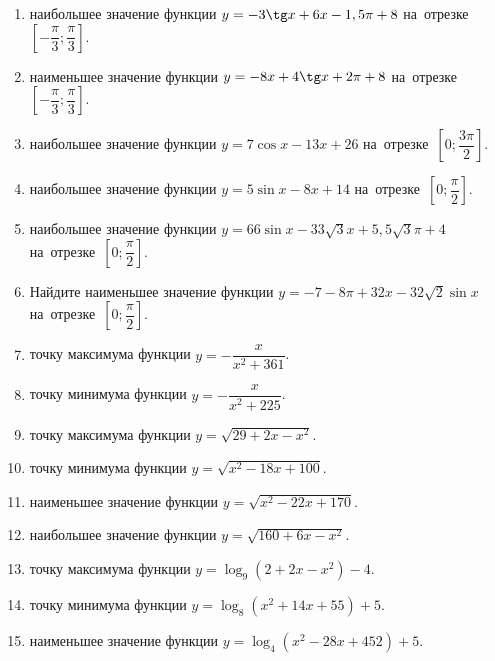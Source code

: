 \documentclass[a4paper,10pt]{article}
\begin{document}
\begin{enumerate}
\item {} наибольшее значение функции $y=-3\tg x +6x-1,5\pi +8$ на~отрезке~$\left[-\dfrac{\pi}{3};\dfrac{\pi}{3}\right]$.

\item {} наименьшее значение функции $y=-8x +4\tg x+2\pi+8$ на~отрезке~$\left[-\dfrac{\pi}{3};\dfrac{\pi}{3}\right]$.

\item {} наибольшее значение функции $y=7\cos x-13x+26$ на~отрезке~$\left[0;\dfrac{3\pi}{2}\right]$.

\item {} наибольшее значение функции $y=5\sin x-8x+14$ на~отрезке~$\left[0;\dfrac{\pi}{2}\right]$.

\item {} наибольшее значение функции $y=66\sin x-33\sqrt{3}x+5,5\sqrt{3}\pi +4$ на~отрезке~$\left[0;\dfrac{\pi}{2}\right]$.

\item Найдите наименьшее значение функции $y=-7-8\pi+32x-32\sqrt{2}\sin x$ на~отрезке~$\left[0;\dfrac{\pi}{2}\right]$.

\item {} точку максимума функции $y=-\dfrac{x}{ x^2 +361}$.

\item {} точку минимума функции $y=-\dfrac{x}{ x^2 +225}$.

\item {} точку максимума функции $y=\sqrt{29+2x-x^2}$.

\item {} точку минимума функции $y=\sqrt{x^2-18x+100}$.

\item {} наименьшее значение функции $y=\sqrt{x^2-22x+170}$.

\item {} наибольшее значение функции $y=\sqrt{160+6x-x^2}$.

\item {} точку максимума функции $y=\log_9\left(2+2x-x^2\right)-4$.

\item {} точку минимума функции $y=\log_8\left(x^2+14x+55\right)+5$.

\item {} наименьшее значение функции $y=\log_4\left(x^2-28x+452\right)+5$.


\end{enumerate}
\end{document}
